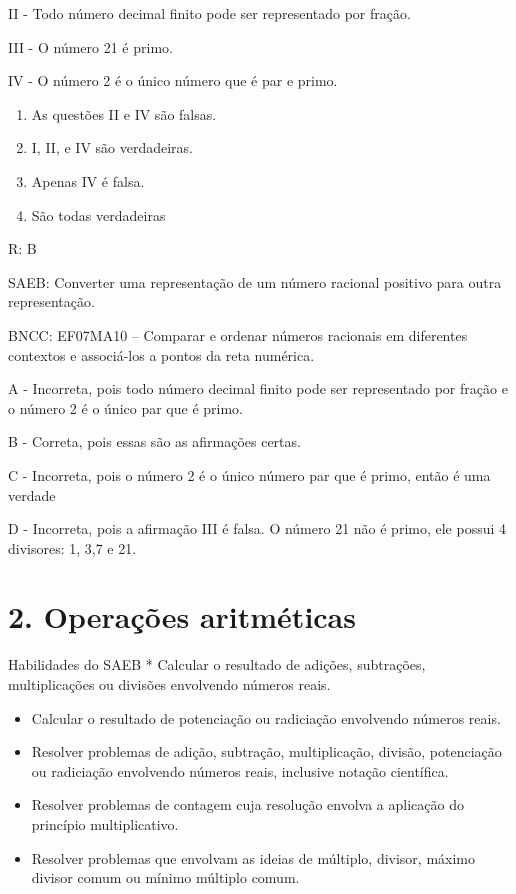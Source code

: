 II - Todo número decimal finito pode ser representado por fração.

III - O número 21 é primo.

IV - O número 2 é o único número que é par e primo.

\begin{enumerate}
\def\labelenumi{\alph{enumi})}
\item
  As questões II e IV são falsas.
\item
  I, II, e IV são verdadeiras.
\item
  Apenas IV é falsa.
\item
  São todas verdadeiras
\end{enumerate}

R: B

SAEB: Converter uma representação de um número racional positivo para
outra representação.

BNCC: EF07MA10 -- Comparar e ordenar números racionais em diferentes
contextos e associá-los a pontos da reta numérica.

A - Incorreta, pois todo número decimal finito pode ser representado por
fração e o número 2 é o único par que é primo.

B - Correta, pois essas são as afirmações certas.

C - Incorreta, pois o número 2 é o único número par que é primo, então é
uma verdade

D - Incorreta, pois a afirmação III é falsa. O número 21 não é primo,
ele possui 4 divisores: 1, 3,7 e 21.

\hypertarget{operauxe7uxf5es-aritmuxe9ticas}{%
\section{2. Operações
aritméticas}\label{operauxe7uxf5es-aritmuxe9ticas}}

Habilidades do SAEB * Calcular o resultado de adições, subtrações,
multiplicações ou divisões envolvendo números reais.

\begin{itemize}
\item
  Calcular o resultado de potenciação ou radiciação envolvendo números
  reais.
\item
  Resolver problemas de adição, subtração, multiplicação, divisão,
  potenciação ou radiciação envolvendo números reais, inclusive notação
  científica.
\item
  Resolver problemas de contagem cuja resolução envolva a aplicação do
  princípio multiplicativo.
\item
  Resolver problemas que envolvam as ideias de múltiplo, divisor, máximo
  divisor comum ou mínimo múltiplo comum.
\end{itemize}

